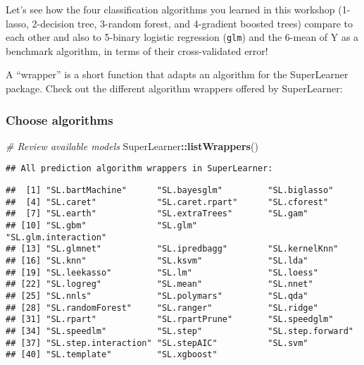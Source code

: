 \documentclass[
]{book}
\newenvironment{Shaded}{\begin{snugshade}}{\end{snugshade}}
\newcommand{\CommentTok}[1]{\textcolor[rgb]{0.56,0.35,0.01}{\textit{#1}}}
\newcommand{\KeywordTok}[1]{\textcolor[rgb]{0.13,0.29,0.53}{\textbf{#1}}}
\newcommand{\NormalTok}[1]{#1}
\newcommand{\OperatorTok}[1]{\textcolor[rgb]{0.81,0.36,0.00}{\textbf{#1}}}
\begin{document}
Let's see how the four classification algorithms you learned in this workshop (1-lasso, 2-decision tree, 3-random forest, and 4-gradient boosted trees) compare to each other and also to 5-binary logistic regression (\texttt{glm}) and the 6-mean of Y as a benchmark algorithm, in terms of their cross-validated error!

A ``wrapper'' is a short function that adapts an algorithm for the SuperLearner package. Check out the different algorithm wrappers offered by SuperLearner:

\hypertarget{choose-algorithms}{%
\subsubsection{Choose algorithms}\label{choose-algorithms}}

\begin{Shaded}
\begin{Highlighting}[]
\CommentTok{\# Review available models}
\NormalTok{SuperLearner}\OperatorTok{::}\KeywordTok{listWrappers}\NormalTok{()}
\end{Highlighting}
\end{Shaded}

\begin{verbatim}
## All prediction algorithm wrappers in SuperLearner:
\end{verbatim}

\begin{verbatim}
##  [1] "SL.bartMachine"      "SL.bayesglm"         "SL.biglasso"        
##  [4] "SL.caret"            "SL.caret.rpart"      "SL.cforest"         
##  [7] "SL.earth"            "SL.extraTrees"       "SL.gam"             
## [10] "SL.gbm"              "SL.glm"              "SL.glm.interaction" 
## [13] "SL.glmnet"           "SL.ipredbagg"        "SL.kernelKnn"       
## [16] "SL.knn"              "SL.ksvm"             "SL.lda"             
## [19] "SL.leekasso"         "SL.lm"               "SL.loess"           
## [22] "SL.logreg"           "SL.mean"             "SL.nnet"            
## [25] "SL.nnls"             "SL.polymars"         "SL.qda"             
## [28] "SL.randomForest"     "SL.ranger"           "SL.ridge"           
## [31] "SL.rpart"            "SL.rpartPrune"       "SL.speedglm"        
## [34] "SL.speedlm"          "SL.step"             "SL.step.forward"    
## [37] "SL.step.interaction" "SL.stepAIC"          "SL.svm"             
## [40] "SL.template"         "SL.xgboost"
\end{verbatim}
\end{document}
